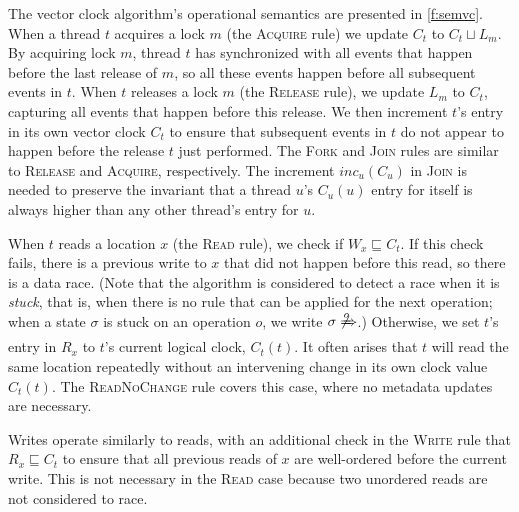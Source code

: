 \documentclass[preprint, 10pt]{sigplanconf}
\newcommand{\Tid}{t}
\newcommand{\TidU}{u}
\newcommand{\Address}{x}
\newcommand{\Lock}{m}
\newcommand{\VCFont}{}
\newcommand{\ThreadVC}[1]{\VCFont{C}_{#1}}
\newcommand{\LockVC}[1]{\VCFont{L}_{#1}}
\newcommand{\ReadVC}[1]{\VCFont{R}_{#1}}
\newcommand{\WriteVC}[1]{\VCFont{W}_{#1}}
\newcommand{\Rule}[1]{\textsc{#1}}
\newcommand{\VCMax}{\sqcup}
\newcommand{\VCCompare}{\sqsubseteq}
\begin{document}
The vector clock algorithm's operational semantics are presented in \autoref{f:semvc}. When a thread $\Tid$ acquires a lock $\Lock$ (the \Rule{Acquire} rule) we update $\ThreadVC{\Tid}$ to $\ThreadVC{\Tid} \VCMax \LockVC{\Lock}$.  By acquiring lock $\Lock$, thread $\Tid$ has synchronized with all events that happen before the last release of $\Lock$, so all these events happen before all subsequent events in $\Tid$.  When $\Tid$ releases a lock $\Lock$ (the \Rule{Release} rule), we update $\LockVC{\Lock}$ to $\ThreadVC{\Tid}$, capturing all events that happen before this release.  We then increment $\Tid$'s entry in its own vector clock $\ThreadVC{\Tid}$ to ensure that subsequent events in $\Tid$ do not appear to happen before the release $\Tid$ just performed.  The \Rule{Fork} and \Rule{Join} rules are similar to \Rule{Release} and \Rule{Acquire}, respectively. The increment $inc_u(C_u)$ in \Rule{Join} is needed to preserve the invariant that a thread $\TidU$'s $\ThreadVC{\TidU}(u)$ entry for itself is always higher than any other thread's entry for $\TidU$.

When $\Tid$ reads a location $\Address$ (the \Rule{Read} rule), we check if $\WriteVC{\Address} \VCCompare \ThreadVC{\Tid}$.  If this check fails, there is a previous write to $\Address$ that did not happen before this read, so there is a data race. (Note that the algorithm is considered to detect a race when it is \emph{stuck}, that is, when there is no rule that can be applied for the next operation; when a state $\sigma$ is stuck on an operation $o$, we write $\sigma \not\xRightarrow{o}$.) Otherwise, we set $\Tid$'s entry in $\ReadVC{\Address}$ to $\Tid$'s current logical clock, $\ThreadVC{\Tid}(\Tid)$.  It often arises that $\Tid$ will read the same location repeatedly without an intervening change in its own clock value $\ThreadVC{\Tid}(\Tid)$. The \Rule{ReadNoChange} rule covers this case, where no metadata updates are necessary.

Writes operate similarly to reads, with an additional check in the \Rule{Write} rule that $\ReadVC{\Address} \VCCompare \ThreadVC{\Tid}$ to ensure that all previous reads of $\Address$ are well-ordered before the current write. This is not necessary in the \Rule{Read} case because two unordered reads are not considered to race.

\end{document}
